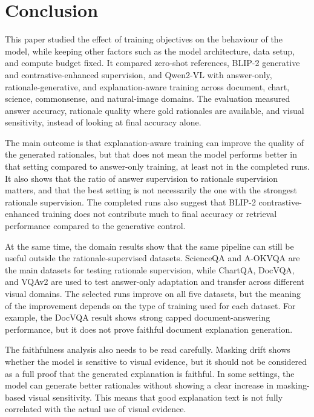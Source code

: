 \documentclass[preprint,12pt]{elsarticle}
\begin{document}
\section{Conclusion}
This paper studied the effect of training objectives on the behaviour of the model, while keeping other factors such as the model architecture, data setup, and compute budget fixed.
It compared zero-shot references, BLIP-2 generative and contrastive-enhanced supervision, and Qwen2-VL with answer-only, rationale-generative, and explanation-aware training across document, chart, science, commonsense, and natural-image domains.
The evaluation measured answer accuracy, rationale quality where gold rationales are available, and visual sensitivity, instead of looking at final accuracy alone.

The main outcome is that explanation-aware training can improve the quality of the generated rationales, but that does not mean the model performs better in that setting compared to answer-only training, at least not in the completed runs.
It also shows that the ratio of answer supervision to rationale supervision matters, and that the best setting is not necessarily the one with the strongest rationale supervision.
The completed runs also suggest that BLIP-2 contrastive-enhanced training does not contribute much to final accuracy or retrieval performance compared to the generative control.

At the same time, the domain results show that the same pipeline can still be useful outside the rationale-supervised datasets.
ScienceQA and A-OKVQA are the main datasets for testing rationale supervision, while ChartQA, DocVQA, and VQAv2 are used to test answer-only adaptation and transfer across different visual domains.
The selected runs improve on all five datasets, but the meaning of the improvement depends on the type of training used for each dataset.
For example, the DocVQA result shows strong capped document-answering performance, but it does not prove faithful document explanation generation.

The faithfulness analysis also needs to be read carefully.
Masking drift shows whether the model is sensitive to visual evidence, but it should not be considered as a full proof that the generated explanation is faithful.
In some settings, the model can generate better rationales without showing a clear increase in masking-based visual sensitivity.
This means that good explanation text is not fully correlated with the actual use of visual evidence.
\end{document}
